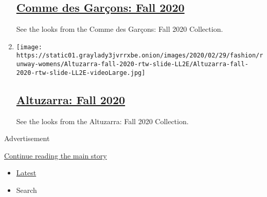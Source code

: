 \begin{enumerate}
  \hypertarget{comme-des-garuxe7ons-fall-2020}{%
  \subsection{\texorpdfstring{\href{/slideshow/2020/02/29/fashion/runway-womens/comme-des-garcons-fall-2020.html}{Comme
  des Garçons: Fall
  2020}}{Comme des Garçons: Fall 2020}}\label{comme-des-garuxe7ons-fall-2020}}

  See the looks from the Comme des Garçons: Fall 2020 Collection.
\item
  \texttt{[image: https://static01.graylady3jvrrxbe.onion/images/2020/02/29/fashion/runway-womens/Altuzarra-fall-2020-rtw-slide-LL2E/Altuzarra-fall-2020-rtw-slide-LL2E-videoLarge.jpg]}

  \hypertarget{altuzarra-fall-2020}{%
  \subsection{\texorpdfstring{\href{/slideshow/2020/02/29/fashion/runway-womens/altuzarra-fall-2020.html}{Altuzarra:
  Fall 2020}}{Altuzarra: Fall 2020}}\label{altuzarra-fall-2020}}

  See the looks from the Altuzarra: Fall 2020 Collection.
\end{enumerate}

Advertisement

\protect\hyperlink{after-mid1}{Continue reading the main story}

\begin{itemize}
\tightlist
\item
  \protect\hyperlink{stream-panel}{Latest}
\item
  Search
\end{itemize}

